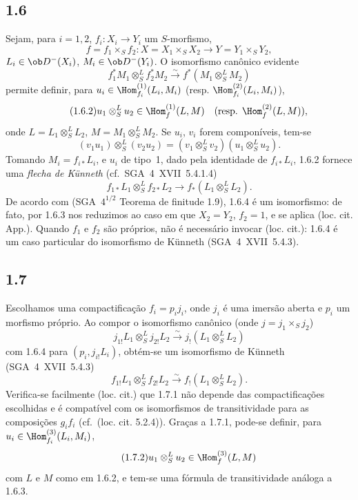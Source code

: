 \subsection*{1.6}
Sejam, para $i=1,2$, $f_i:X_i\to Y_i$ um $S$-morfismo,
\[
f=f_1\times_S f_2:X=X_1\times_S X_2\to Y=Y_1\times_S Y_2,
\]
$L_i\in\ob D^{-}(X_i)$, $M_i\in\ob D^{-}(Y_i)$. O isomorfismo canônico evidente
\begin{equation}\tag{1.6.1}
f_1^{*}M_1\otimes^{L}_{S}f_2^{*}M_2\xrightarrow{\sim}f^{*}(M_1\otimes^{L}_{S}M_2)
\end{equation}
permite definir, para $u_i\in\Hom_{f_i}^{(1)}(L_i,M_i)$ (resp. $\Hom_{f_i}^{(2)}(L_i,M_i)$),
\begin{equation}\tag{1.6.2}
u_1\otimes^{L}_{S}u_2\in\Hom_{f}^{(1)}(L,M)\quad(\text{resp. }\Hom_f^{(2)}(L,M)),
\end{equation}
onde $L=L_1\otimes^{L}_{S}L_2$, $M=M_1\otimes^{L}_{S}M_2$. Se $u_i$, $v_i$ forem componíveis, tem-se
\begin{equation}\tag{1.6.3}
(v_1u_1)\otimes^{L}_{S}(v_2u_2)=(v_1\otimes^{L}_{S}v_2)(u_1\otimes^{L}_{S}u_2).
\end{equation}
Tomando $M_i=f_{i*}L_i$, e $u_i$ de tipo~1, dado pela identidade de $f_{i*}L_i$, 1.6.2 fornece uma \emph{flecha de Künneth} (cf.~SGA~4~XVII~5.4.1.4)
\begin{equation}\tag{1.6.4}
f_{1*}L_1\otimes^{L}_{S}f_{2*}L_2\longrightarrow f_{*}(L_1\otimes^{L}_{S}L_2).
\end{equation}
De acordo com (SGA~$4^{1/2}$ Teorema de finitude 1.9), 1.6.4 é um isomorfismo: de fato, por 1.6.3 nos reduzimos ao caso em que $X_2=Y_2$, $f_2=1$, e se aplica (loc. cit. App.). Quando $f_1$ e $f_2$ são próprios, não é necessário invocar (loc. cit.): 1.6.4 é um caso particular do isomorfismo de Künneth (SGA~4~XVII~5.4.3).

\subsection*{1.7}
Escolhamos uma compactificação $f_i=p_i j_i$, onde $j_i$ é uma imersão aberta e $p_i$ um morfismo próprio. Ao compor o isomorfismo canônico (onde $j=j_1\times_S j_2$)
\[
j_{1!}L_1\otimes^{L}_{S}j_{2!}L_2\xrightarrow{\sim}j_{!}(L_1\otimes^{L}_{S}L_2)
\]
com 1.6.4 para $(p_i,j_{i!}L_i)$, obtém-se um isomorfismo de Künneth (SGA~4~XVII~5.4.3)
\begin{equation}\tag{1.7.1}
f_{1!}L_1\otimes^{L}_{S}f_{2!}L_2\xrightarrow{\sim}f_{!}(L_1\otimes^{L}_{S}L_2).
\end{equation}
Verifica-se facilmente (loc. cit.) que 1.7.1 não depende das compactificações escolhidas e é compatível com os isomorfismos de transitividade para as composições $g_if_i$ (cf.~(loc. cit. 5.2.4)). Graças a 1.7.1, pode-se definir, para $u_i\in\Hom_{f_i}^{(3)}(L_i,M_i)$,
\begin{equation}\tag{1.7.2}
u_1\otimes^{L}_{S}u_2\in\Hom_f^{(3)}(L,M)
\end{equation}
com $L$ e $M$ como em 1.6.2, e tem-se uma fórmula de transitividade análoga a 1.6.3.


